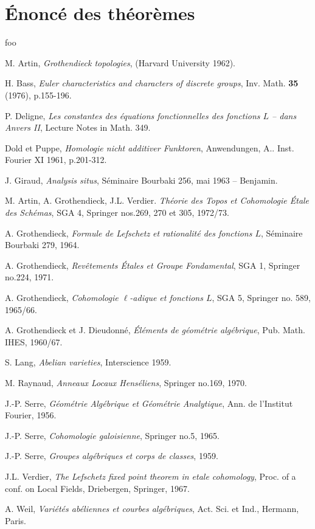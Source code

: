 \documentclass[oneside]{book}
\begin{document}
\section{Énoncé des théorèmes}\label{VII:1}

\begin{theorem_}\label{VII:1-1}
foo
\end{theorem_}










\begin{thebibliography}{ab}
   M. Artin, \emph{Grothendieck topologies}, (Harvard University 1962).
  
   H. Bass, \emph{Euler characteristics and characters of discrete groups}, Inv. Math. \textbf{35} (1976), p.155-196. 
  
   P. Deligne, \emph{Les constantes des équations fonctionnelles des fonctions $L$ -- dans Anvers II}, Lecture Notes in Math. 349. 

   Dold et Puppe, \emph{Homologie nicht additiver Funktoren}, Anwendungen, A.. Inst. Fourier XI 1961, p.201-312. 

   J. Giraud, \emph{Analysis situs}, Séminaire Bourbaki 256, mai 1963 -- Benjamin. 

   M. Artin, A. Grothendieck, J.L. Verdier. \emph{Théorie des Topos et Cohomologie Étale des Schémas}, SGA 4, Springer nos.269, 270 et 305, 1972/73.

   A. Grothendieck, \emph{Formule de Lefschetz et rationalité des fonctions $L$}, Séminaire Bourbaki 279, 1964. 

   A. Grothendieck, \emph{Revêtements Étales et Groupe Fondamental}, SGA 1, Springer no.224, 1971.
  
   A. Grothendieck, \emph{Cohomologie $\ell$-adique et fonctions $L$}, SGA 5, Springer no. 589, 1965/66. 
  
   A. Grothendieck et J. Dieudonné, \emph{Éléments de géométrie algébrique}, Pub. Math. IHES, 1960/67. 
  
   S. Lang, \emph{Abelian varieties}, Interscience 1959. 

   M. Raynaud, \emph{Anneaux Locaux Henséliens}, Springer no.169, 1970. 
  
   J.-P. Serre, \emph{Géométrie Algébrique et Géométrie Analytique}, Ann. de l'Institut Fourier, 1956. 

   J.-P. Serre, \emph{Cohomologie galoisienne}, Springer no.5, 1965.

   J.-P. Serre, \emph{Groupes algébriques et corps de classes}, 1959. 

   J.L. Verdier, \emph{The Lefschetz fixed point theorem in etale cohomology}, Proc. of a conf. on Local Fields, Driebergen, Springer, 1967. 
  
   A. Weil, \emph{Variétés abéliennes et courbes algébriques}, Act. Sci. et Ind., Hermann, Paris. 

\end{thebibliography}
\end{document}
